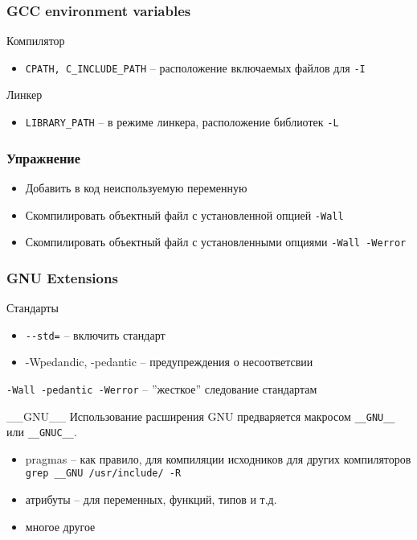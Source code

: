 \begin{frame}[fragile]
	\frametitle{GCC environment variables}

	\begin{block}{Компилятор}
		\begin{itemize}
		    \item {\tt CPATH, C\_INCLUDE\_PATH} -- расположение включаемых файлов для {\tt -I}
		\end{itemize}
	\end{block}
    \begin{block}{Линкер}
      \begin{itemize}
          \item {\tt LIBRARY\_PATH} -- в режиме линкера, расположение библиотек {\tt -L} 
      \end{itemize}
    \end{block}
\end{frame}

\begin{frame}
	\frametitle{Упражнение}
	\begin{itemize}
		\item Добавить в код неиспользуемую переменную
		\item Скомпилировать объектный файл с установленной опцией {\tt -Wall}
		\item Скомпилировать объектный файл с установленными опциями {\tt -Wall -Werror}
	\end{itemize}
\end{frame}

\begin{frame}[fragile]
\frametitle{GNU Extensions}

	\begin{block}{Стандарты}
		\begin{itemize}
            \item {\tt -{}-std=} -- включить стандарт
			\item -Wpedandic, -pedantic -- предупреждения о несоответсвии
		\end{itemize}
        {\tt -Wall -pedantic -Werror} -- ''жесткое'' следование стандартам
	\end{block}

	\begin{block}{\_\_GNU\_\_}
        Использование расширения GNU предваряется макросом {\tt \_\_GNU\_\_} или {\tt \_\_GNUC\_\_}.
		\begin{itemize}
            \item pragmas -- как правило, для компиляции исходников для других компиляторов\\
                {\tt grep \_\_GNU /usr/include/ -R}
            \item атрибуты -- для переменных, функций, типов и т.д.
            \item многое другое 
		\end{itemize}
	\end{block}
\end{frame}

